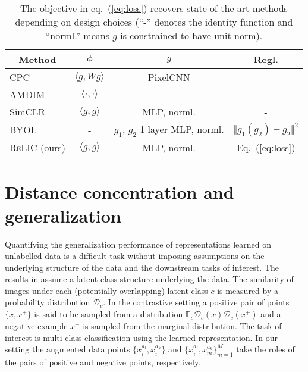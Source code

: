 \documentclass{article}
\def\eqref#1{eq.~(\ref{#1})}
\def\Eqref#1{Eq.~(\ref{#1})}
\newcommand{\relic}{\textsc{ReLIC}}
\begin{document}
\begin{table}[h]
\begin{center}
\caption{The objective in \eqref{eq:loss} recovers state of the art methods depending on design choices  (``-'' denotes the identity function and ``norml.'' means $g$ is constrained to have unit norm). \label{tab:methods}}
\vspace{0.2cm}
\begin{tabular}{l|c|c|c}
\multicolumn{1}{c|}{Method}       & $\phi$                               & $g$  & Regl. \\ \hline
CPC   \citep{henaff2019data}   & $\langle g, W g \rangle$     & PixelCNN & - \\
AMDIM \citep{bachman2019learning}  & $\langle \cdot, \cdot \rangle$       & - & - \\
SimCLR \citep{chen2020simple} & $\langle g, g \rangle$ & MLP, norml. & -  \\
BYOL \citep{grill2020bootstrap} & - & $g_1$, $g_2$ 1 layer MLP, norml. & $\Vert g_1(g_2) - g_2  \Vert^2$   \\ 
\relic \; (ours)& $\langle g, g \rangle$ & MLP, norml. & \Eqref{eq:loss}  \\
\end{tabular}
\end{center}
\end{table}
 \section{Distance concentration and generalization} \label{sec:gen-theory_main}


Quantifying the generalization performance of representations learned on unlabelled data is a difficult task without imposing assumptions on the underlying structure of the data and the downstream tasks of interest. The results in \citep{saunshi2019theoretical} assume a latent class structure underlying the data. The similarity of images under each (potentially overlapping) latent class $c$ is measured by a probability distribution $\mathcal{D}_c$. In the contrastive setting a positive pair of points $\{x, x^{+}\}$ is said to be sampled from a distribution $\mathbb{E}_c \mathcal{D}_c(x) \mathcal{D}_c(x^{+})$ and a negative example $x^{-}$ is sampled from the marginal distribution. The task of interest is multi-class classification using the learned representation. In our setting the augmented data points $\{x^{a_l}_i, x_i^{a_k}\}$ and $\{x^{a_l}_i, x_m^{a_k}\}_{m=1}^M$ take the roles of the pairs of positive and negative points, respectively.
\end{document}
